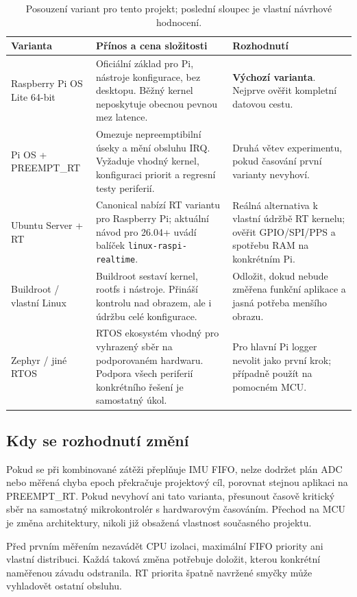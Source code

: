 \documentclass[11pt,a4paper]{article}
\begin{document}
\begin{table}[htbp]\centering\small
\caption{Posouzení variant pro tento projekt; poslední sloupec je vlastní návrhové hodnocení.}
\begin{tabularx}{\textwidth}{L{34mm}Y Y}
\toprule Varianta & Přínos a cena složitosti & Rozhodnutí\\\midrule
Raspberry Pi OS Lite 64-bit & Oficiální základ pro Pi, nástroje konfigurace, bez desktopu. Běžný kernel neposkytuje obecnou pevnou mez latence.\cite{rpos,rt} & \textbf{Výchozí varianta}. Nejprve ověřit kompletní datovou cestu.\\\addlinespace
Pi OS + PREEMPT\_RT & Omezuje nepreemptibilní úseky a mění obsluhu IRQ. Vyžaduje vhodný kernel, konfiguraci priorit a regresní testy periferií.\cite{rt} & Druhá větev experimentu, pokud časování první varianty nevyhoví.\\\addlinespace
Ubuntu Server + RT & Canonical nabízí RT variantu pro Raspberry Pi; aktuální návod pro 26.04+ uvádí balíček \texttt{linux-raspi-realtime}.\cite{ubuntu} & Reálná alternativa k vlastní údržbě RT kernelu; ověřit GPIO/SPI/PPS a spotřebu RAM na konkrétním Pi.\\\addlinespace
Buildroot / vlastní Linux & Buildroot sestaví kernel, rootfs i nástroje. Přináší kontrolu nad obrazem, ale i údržbu celé konfigurace.\cite{buildroot} & Odložit, dokud nebude změřena funkční aplikace a jasná potřeba menšího obrazu.\\\addlinespace
Zephyr / jiné RTOS & RTOS ekosystém vhodný pro vyhrazený sběr na podporovaném hardwaru. Podpora všech periferií konkrétního řešení je samostatný úkol.\cite{zephyr} & Pro hlavní Pi logger nevolit jako první krok; případně použít na pomocném MCU.\\
\bottomrule\end{tabularx}\end{table}

\subsection{Kdy se rozhodnutí změní}
Pokud se při kombinované zátěži přeplňuje IMU FIFO, nelze dodržet plán ADC nebo měřená chyba epoch překračuje projektový cíl, porovnat stejnou aplikaci na PREEMPT\_RT. Pokud nevyhoví ani tato varianta, přesunout časově kritický sběr na samostatný mikrokontrolér s hardwarovým časováním. Přechod na MCU je změna architektury, nikoli již obsažená vlastnost současného projektu.

Před prvním měřením nezavádět CPU izolaci, maximální FIFO priority ani vlastní distribuci. Každá taková změna potřebuje doložit, kterou konkrétní naměřenou závadu odstranila. RT priorita špatně navržené smyčky může vyhladovět ostatní obsluhu.
\end{document}
